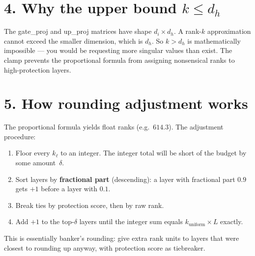 \documentclass[11pt]{article}
\begin{document}
\section*{4. Why the upper bound $k \leq d_h$}

The gate\_proj and up\_proj matrices have shape $d_i \times d_h$.  A rank-$k$ approximation cannot exceed the smaller dimension, which is $d_h$.  So $k > d_h$ is mathematically impossible --- you would be requesting more singular values than exist.  The clamp prevents the proportional formula from assigning nonsensical ranks to high-protection layers.

\section*{5. How rounding adjustment works}

The proportional formula yields float ranks (e.g.\ $614.3$).  The adjustment procedure:

\begin{enumerate}
    \item Floor every $k_\ell$ to an integer.  The integer total will be short of the budget by some amount~$\delta$.
    \item Sort layers by \textbf{fractional part} (descending): a layer with fractional part $0.9$ gets $+1$ before a layer with $0.1$.
    \item Break ties by protection score, then by raw rank.
    \item Add $+1$ to the top-$\delta$ layers until the integer sum equals $k_{\mathrm{uniform}} \times L$ exactly.
\end{enumerate}

This is essentially banker's rounding: give extra rank units to layers that were closest to rounding up anyway, with protection score as tiebreaker.
\end{document}

